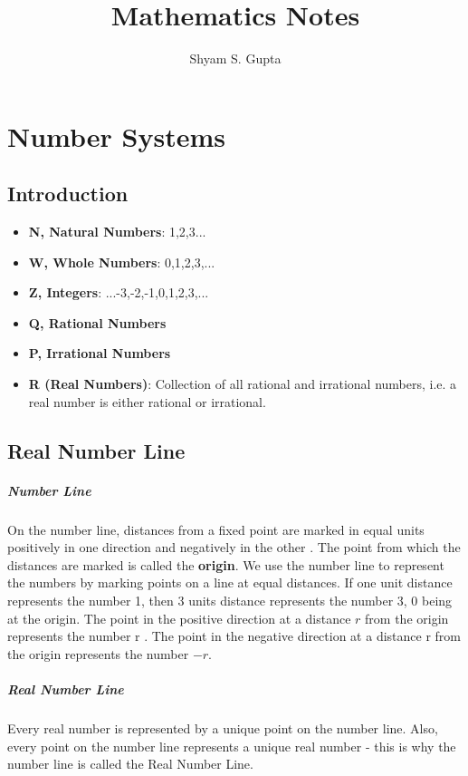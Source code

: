 \documentclass{book}
\title{Mathematics Notes}
\author{Shyam S. Gupta}
\date{\displaydate{date}}
\begin{document}
	\maketitle
	\tableofcontents

	\chapter{Number Systems}
	\section{Introduction}
	\begin{itemize}
	\item \textbf{N, Natural Numbers}: 1,2,3...
	\item \textbf{W, Whole Numbers}: 0,1,2,3,...
	\item \textbf{Z, Integers}: ...-3,-2,-1,0,1,2,3,...
	\item \textbf{Q, Rational Numbers}
	\item \textbf{P, Irrational Numbers}
	\item \textbf{R (Real Numbers)}: Collection of all rational and irrational numbers, i.e. a real number is either rational or irrational.
	\end{itemize}
	
	\section{Real Number Line}
	\paragraph{Number Line}
	On the number line, distances from a fixed point are marked in equal units positively in one direction and negatively in the other . The point from which the distances are marked is called the \textbf{origin}. We use the number line to represent the numbers by marking points on a line at equal distances. If one unit distance represents the number 1, then 3 units distance represents the number 3, 0 being at the origin. The point in the positive direction at a distance $r$  from the origin represents the number r . The point in the negative direction at a distance r  from the origin represents the number $-r$.
	\paragraph{Real Number Line}
	Every real number is represented by a unique point on the number line. Also, every point on the number line represents a unique real number - this is why the number line is called the Real Number Line.
	
\end{document}
